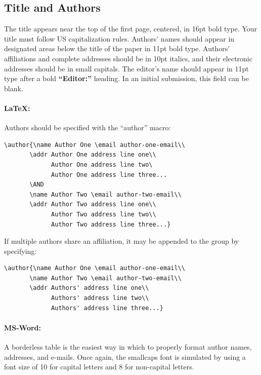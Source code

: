 \documentclass[twoside,11pt]{article}
\begin{document}
\subsection{Title and Authors}
The title appears near the top of the first page, centered, in 16pt bold type.  Your title must follow US capitalization rules.  Authors' names should appear in designated areas below the title of the paper in 11pt bold type. Authors' affiliations and complete addresses should be in 10pt italics, and their electronic addresses should be in small capitals.  The editor's name should appear in 11pt type after a bold {\bf ``Editor:''} heading. In an initial submission, this field can be blank.

\paragraph{\LaTeX{}:} Authors should be specified with the ``author'' macro: 
\begin{verbatim}\author{\name Author One \email author-one-email\\
       \addr Author One address line one\\ 
             Author One address line two\ 
             Author One address line three... 
       \AND 
       \name Author Two \email author-two-email\\
       \addr Author Two address line one\\ 
             Author Two address line two\\ 
             Author Two address line three...} 
\end{verbatim}

If multiple authors share an affiliation, it may be appended to the group by specifying: 
\begin{verbatim}\author{\name Author One \email author-one-email\\ 
       \name Author Two \email author-two-email\\ 
       \addr Authors' address line one\\
             Authors' address line two\\ 
             Authors' address line three...} 
\end{verbatim}

\paragraph{MS-Word:}  A borderless table is the easiest way in which to properly format author names, addresses, and e-mails.  Once again, the smallcaps font is simulated by using a font size of 10 for capital letters and 8 for non-capital letters.
\end{document}
